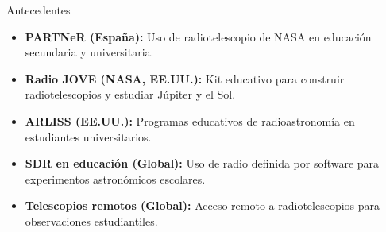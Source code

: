 \begin{frame}{Antecedentes}
  \begin{itemize}
    \item \textbf{PARTNeR (España):} Uso de radiotelescopio de NASA en educación secundaria y universitaria.
      \pause
    \item \textbf{Radio JOVE (NASA, EE.UU.):} Kit educativo para construir radiotelescopios y estudiar Júpiter y el Sol.
      \pause
    \item \textbf{ARLISS (EE.UU.):} Programas educativos de radioastronomía en estudiantes universitarios.
      \pause
    \item \textbf{SDR en educación (Global):} Uso de radio definida por software para experimentos astronómicos escolares.
      \pause
    \item \textbf{Telescopios remotos (Global):} Acceso remoto a radiotelescopios para observaciones estudiantiles.
  \end{itemize}
\end{frame}

